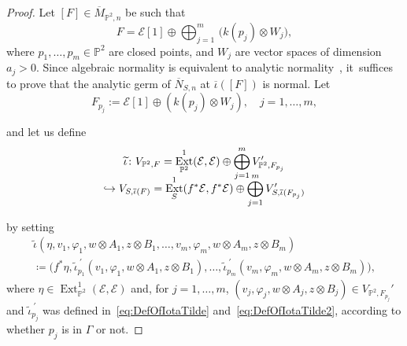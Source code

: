 \documentclass[11pt]{article}
\newcommand\hto{\mathrel{\lhook\joinrel\to}}
\newcommand{\PP}{{\mathbb P}}\let\P\PP
\newcommand\cE{\mathcal{E}}
\DeclareMathOperator{\Ext}{Ext}
\let\ov\overline
\let\phi\varphi
\theoremstyle{definition}
\begin{document}
\begin{proof}
Let $[F]\in\overline{M}_{\PP^2,n}$ be such that\vspace*{-5pt}
\[
F=\cE[1]\oplus \bigoplus_{j=1}^m\, \bigl(k(p_j)\otimes W_j \bigr),
\]
where $p_1,\dots,p_m\in \PP^2$ are closed points, and $W_j$ are vector spaces of dimension $a_j>0$.
Since algebraic normality is equivalent to analytic normality~\cite[Satz 4]{Kuh}, it~suffices to prove that the analytic germ of $\overline{N}_{S,n}$ at $\ov{\iota}([F])$ is normal.
Let\vspace*{-3pt}
\[
F_{p_j}:=\cE[1]\oplus \left(k(p_j)\otimes W_j\right),\quad j=1,\dots,m,
\]
\noindent
\begin{minipage}{\textwidth}
and let us define\vspace*{-5pt}
\begin{multline}\label{eq:01122025}
\widetilde{\iota}\colon V_{\PP^2,F}= \Ext^1_{\PP^2}(\cE,\cE)\oplus \bigoplus_{j=1}^m V_{\PP^2,F_{p_j}}'\\[-10pt]
\hto V_{S,\overline{\iota}(F)}=\Ext^1_{S}(f^*\cE,f^*\cE)\oplus \bigoplus_{j=1}^m V_{S,\overline{\iota}(F_{p_j})}'
\end{multline}
\end{minipage}
\par\noindent
by setting\vspace*{-5pt}
\begin{multline*}
\widetilde{\iota}\left(\eta,v_1,\phi_1,w\otimes A_1,z\otimes B_1,\dots,v_m,\phi_m,w\otimes A_m,z\otimes B_m\right)\\
\coloneqq \bigl(f^*\eta,\widetilde{\iota}_{p_1}^{\ \prime}(v_1,\phi_1,w\otimes A_1,z\otimes B_1),\dots,\widetilde{\iota}_{p_m}^{\ \prime}(v_m,\phi_m,w\otimes A_m,z\otimes B_m)\bigr),
\end{multline*}
where $\eta\in\Ext^1_{\PP^2}(\cE,\cE)$ and, for $j=1,\dots,m$, $(v_j,\phi_j,w\otimes A_j,z\otimes B_j)\in V_{\PP^2,F_{p_j}}'$ and $\widetilde{\iota}_{p_j}^{\ \prime}$ was defined in~\eqref{eq:DefOfIotaTilde} and~\eqref{eq:DefOfIotaTilde2}, according to whether $p_j$ is in $\mathsf{\Gamma}$ or not.


\end{proof}
\end{document}
